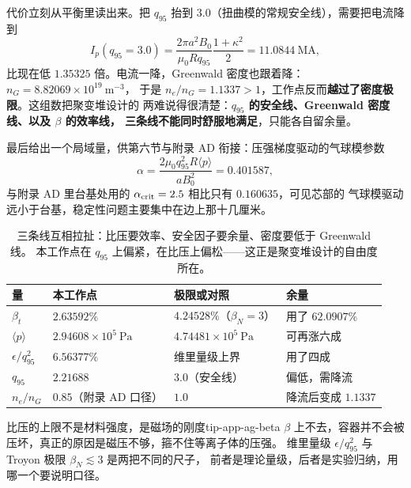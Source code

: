 代价立刻从平衡里读出来。把 $q_{95}$ 抬到 $3.0$（扭曲模的常规安全线），需要把电流降到
\begin{equation}
I_p(q_{95}=3.0) = \frac{2\pi a^2 B_0}{\mu_0 R q_{95}}\frac{1+\kappa^2}{2}
= 11.0844\ \mathrm{MA},
\label{eq:app-ag-alpha}
\end{equation}
比现在低 $1.35325$ 倍。电流一降，Greenwald 密度也跟着降：$n_G = 8.82069\times10^{19}\ \mathrm{m^{-3}}$，
于是 $n_e/n_G = 1.1337>1$，工作点反而\textbf{越过了密度极限}。这组数把聚变堆设计的
两难说得很清楚：\textbf{$q_{95}$ 的安全线、Greenwald 密度线、以及 $\beta$ 的效率线，
三条线不能同时舒服地满足}，只能各自留余量。

最后给出一个局域量，供第六节与附录 AD 衔接：压强梯度驱动的气球模参数
\begin{equation}
\alpha = \frac{2\mu_0 q_{95}^2 R \langle p\rangle}{a B_0^2} = 0.401587,
\label{eq:app-ag-mercier}
\end{equation}
与附录 AD 里台基处用的 $\alpha_{\rm crit}=2.5$ 相比只有 $0.160635$，可见芯部的
气球模驱动远小于台基，稳定性问题主要集中在边上那十几厘米。

\begin{table}[htbp]
\centering
\small
\caption{三条线互相拉扯：比压要效率、安全因子要余量、密度要低于 Greenwald 线。
本工作点在 $q_{95}$ 上偏紧，在比压上偏松——这正是聚变堆设计的自由度所在。}
\label{tab:app-ag-beta}
\begin{tabular}{p{3.4cm}p{3.0cm}p{2.8cm}p{4.4cm}}
\toprule
量 & 本工作点 & 极限或对照 & 余量 \\
\midrule
$\beta_t$ & $2.63592\%$ & $4.24528\%$（$\beta_N=3$） & 用了 $62.0907\%$ \\
$\langle p\rangle$ & $2.94608\times10^{5}\ \mathrm{Pa}$ & $4.74481\times10^{5}\ \mathrm{Pa}$ & 可再涨六成 \\
$\epsilon/q_{95}^2$ & $6.56377\%$ & 维里量级上界 & 用了四成 \\
$q_{95}$ & $2.21688$ & $3.0$（安全线） & 偏低，需降流 \\
$n_e/n_G$ & $0.85$（附录 AD 口径） & $1.0$ & 降流后变成 $1.1337$ \\
\bottomrule
\end{tabular}

\end{table}

\begin{tip}{比压的上限不是材料强度，是磁场的刚度}{tip-app-ag-beta}
$\beta$ 上不去，容器并不会被压坏，真正的原因是磁压不够，箍不住等离子体的压强。
维里量级 $\epsilon/q_{95}^2$ 与 Troyon 极限 $\beta_N\lesssim3$ 是两把不同的尺子，
前者是理论量级，后者是实验归纳，用哪一个要说明口径。
\end{tip}

